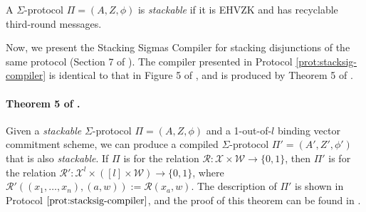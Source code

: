 \begin{definition}
  \label{def:stackable}
  A $\Sigma$-protocol $\Pi = (A, Z, \phi)$ is \textit{stackable} if it is EHVZK and has recyclable third-round messages.
\end{definition}

  Now, we present the Stacking Sigmas Compiler for stacking disjunctions of the same protocol (Section 7 of \cite{StackingSigmas}). The compiler 
  presented in Protocol \ref{prot:stacksig-compiler} is identical to that in Figure 5 of \cite{StackingSigmas}, and is produced by Theorem 5 of \cite{StackingSigmas}.

  \paragraph{Theorem 5 of \cite{StackingSigmas}.} Given a \textit{stackable} $\Sigma$-protocol $\Pi = (A, Z, \phi)$ and a 
  1-out-of-$l$ binding vector commitment scheme, we can produce a compiled $\Sigma$-protocol $\Pi' = (A', Z', \phi')$ that is also \textit{stackable}. If 
  $\Pi$ is for the relation $\mathcal R: \mathcal X \times \mathcal W \rightarrow \{0,1\}$, then $\Pi'$ is for the relation $\mathcal R': \mathcal X^l \times 
  ([l] \times \mathcal W) \rightarrow \{0,1\}$, where $\mathcal R'((x_1,\ldots, x_n), (a,w)) := \mathcal R(x_a, w)$.
  The 
  description of $\Pi'$ is shown in Protocol $\ref{prot:stacksig-compiler}$, and the proof of this theorem can be found in \cite{StackingSigmas}.

